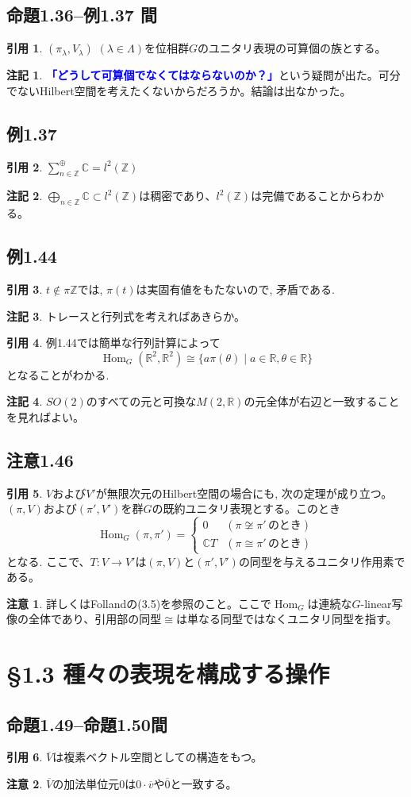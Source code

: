 \documentclass[12pt]{jsarticle}
\newcommand{\R}{\mathbb{R}}
\newcommand{\Z}{\mathbb{Z}}
\newcommand{\C}{\mathbb{C}}
\newcommand{\textblue}[1]{\textcolor{blue}{\textbf{#1}}}
\DeclareMathOperator{\Hom}{Hom}
\theoremstyle{definition}%
\newtheorem*{rem}{注意}
\newtheorem*{note}{注記}
\newtheorem*{quo}{引用}%
\renewenvironment{leftbar}{%
  \renewcommand\FrameCommand{\vrule width 1pt \hspace{10pt}}%
  \MakeFramed {\advance\hsize-\width \FrameRestore}}%
 {\endMakeFramed}
\newcommand{\barquo}[1]{\begin{leftbar} \begin{quo}  #1 \end{quo} \end{leftbar}}
\newcommand{\bfsubsection}[1]{\subsection*{\textbf{#1}}}
\begin{document}
\bfsubsection{命題1.36--例1.37 間}
\barquo{
$(\pi_{\lambda}, V_{\lambda})$ $(\lambda \in \Lambda)$を位相群$G$のユニタリ表現の可算個の族とする。
}
\begin{note}
  \textblue{「どうして可算個でなくてはならないのか？」}という疑問が出た。可分でないHilbert空間を考えたくないからだろうか。結論は出なかった。
\end{note}


\bfsubsection{例1.37}
\barquo{
$\sum_{n \in \Z}^{\oplus} \C = l^2(\Z)$
}
\begin{note}
  $\bigoplus_{n \in \Z} \C \subset l^2(\Z)$は稠密であり、$l^2(\Z)$は完備であることからわかる。
\end{note}


\bfsubsection{例1.44}
\barquo{
$t \not\in \pi\Z$では, $\pi(t)$は実固有値をもたないので, 矛盾である.
}
\begin{note}
トレースと行列式を考えればあきらか。
\end{note}


\barquo{
例1.44では簡単な行列計算によって
\[
\Hom_G(\R^2,\R^2) \cong \{ a\pi(\theta) \mid a \in \R, \theta \in \R \}
\]
となることがわかる.
}
\begin{note}
$SO(2)$のすべての元と可換な$M(2,\R)$の元全体が右辺と一致することを見ればよい。
\end{note}

\bfsubsection{注意1.46}
\barquo{
$V$および$V'$が無限次元のHilbert空間の場合にも, 次の定理が成り立つ。$(\pi,V)$および$(\pi',V')$を群$G$の既約ユニタリ表現とする。このとき
\[
\Hom_G(\pi,\pi') = \begin{cases}
0 &(\pi \not\cong \pi' \, \text{のとき}) \\
\C T &(\pi \cong \pi' \, \text{のとき})
\end{cases}
\]
となる. ここで、$T \colon V \to V'$は$(\pi,V)$と$(\pi',V')$の同型を与えるユニタリ作用素である。
}
\begin{rem}
詳しくはFolland\cite{Folland}の(3.5)を参照のこと。ここで$\Hom_G$は連続な$G$-linear写像の全体であり、引用部の同型$\cong$は単なる同型ではなくユニタリ同型を指す。
\end{rem}






\section*{\S 1.3 種々の表現を構成する操作}
\bfsubsection{命題1.49--命題1.50間}
\barquo{
$\overline{V}$は複素ベクトル空間としての構造をもつ。
}
\begin{rem}
  $\overline{V}$の加法単位元$0$は$0 \cdot \overline{v}$や$\overline{0}$と一致する。
\end{rem}
\end{document}

